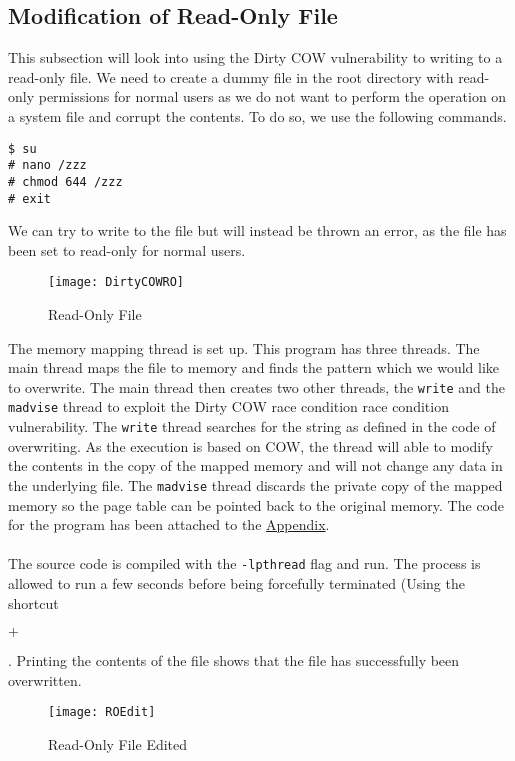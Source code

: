 \documentclass[a4paper,12pt]{article}
\begin{document}
\subsection{Modification of Read-Only File}\label{task1}
This subsection will look into using the Dirty COW vulnerability to writing to a read-only file. We need to create a dummy file in the root directory with read-only permissions for normal users as we do not want to perform the operation on a system file and corrupt the contents. To do so, we use the following commands.
\begin{verbatim}
$ su
# nano /zzz
# chmod 644 /zzz
# exit
\end{verbatim}
We can try to write to the file but will instead be thrown an error, as the file has been set to read-only for normal users.
\begin{figure}[H]
\centering
\texttt{[image: DirtyCOWRO]}
\caption{Read-Only File}
\label{fig:dirtycowro}
\end{figure}
\noindent The memory mapping thread is set up. This program has three threads. The main thread maps the file to memory and finds the pattern which we would like to overwrite. The main thread then creates two other threads, the \texttt{write} and the \texttt{madvise} thread to exploit the Dirty COW race condition race condition vulnerability. The \texttt{write} thread searches for the string as defined in the code of overwriting. As the execution is based on COW, the thread will able to modify the contents in the copy of the mapped memory and will not change any data in the underlying file. The \texttt{madvise} thread discards the private copy of the mapped memory so the page table can be pointed back to the original memory. The code for the program has been attached to the \hyperref[Appsec:2]{Appendix}. \\\\The source code is compiled with the \texttt{-lpthread} flag and run. The process is allowed to run a few seconds before being forcefully terminated (Using the shortcut  $+$ . Printing the contents of the file shows that the file has successfully been overwritten.
\begin{figure}[H]
\centering
\texttt{[image: ROEdit]}
\caption{Read-Only File Edited}
\label{fig:roedit}
\end{figure}
\end{document}
